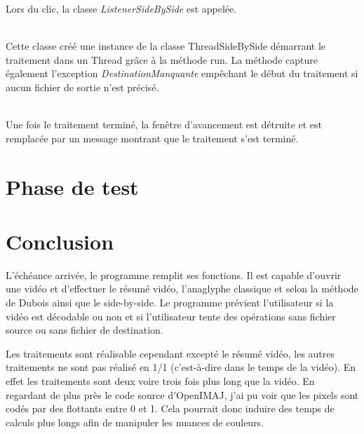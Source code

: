 \documentclass[10pt,a4paper]{article}
\begin{document}
Lors du clic, la classe \textit{ListenerSideBySide} est appelée.


~~\\

Cette classe créé une instance de la classe ThreadSideBySide démarrant le traitement dans un Thread grâce à la méthode run. La méthode capture également l'exception \textit{DestinationManquante} empêchant
le début du traitement si aucun fichier de sortie n'est précisé.


~~\\

Une fois le traitement terminé, la fenêtre d'avancement est détruite et est remplacée par un message montrant que le traitement s'est terminé.


\section{Phase de test}

\section{Conclusion}

L'échéance arrivée, le programme remplit ses fonctions. Il est capable d'ouvrir une vidéo et d'effectuer le résumé vidéo, l'anaglyphe classique et selon la méthode de Dubois ainsi que le side-by-side. Le programme prévient l'utilisateur si la vidéo est décodable ou non et si l'utilisateur tente des opérations sans fichier source ou sans fichier de destination.

Les traitements sont réalisable cependant excepté le résumé vidéo, les autres traitements ne sont pas réalisé en 1/1 (c'est-à-dire dans le temps de la vidéo). En effet les traitements sont deux voire trois fois plus long que la vidéo. En regardant de plus près le code source d'OpenIMAJ, j'ai pu voir que les pixels sont codés par des flottants entre  0 et 1. Cela pourrait donc induire des temps de calculs plus longs afin de manipuler les nuances de couleurs.
\end{document}
